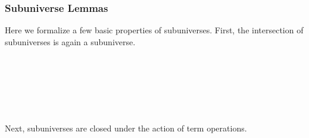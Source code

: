 \subsubsection{Subuniverse Lemmas}\label{subuniverse-lemmas}
Here we formalize a few basic properties of subuniverses. First, the intersection of subuniverses is again a subuniverse.
\ccpad
\begin{code}%
\>[0]\AgdaSpace{}%
\AgdaSymbol{:}%
\>[101I]\AgdaSymbol{\{}\AgdaSpace{}%
\AgdaSymbol{:}\AgdaSpace{}%
\AgdaSpace{}%
\AgdaSpace{}%
\AgdaSymbol{\}\{}\AgdaSpace{}%
\AgdaSymbol{:}\AgdaSpace{}%
\AgdaSpace{}%
\AgdaSymbol{\}\{}\AgdaSpace{}%
\AgdaSymbol{:}\AgdaSpace{}%
\AgdaSpace{}%
\AgdaSpace{}%
\AgdaSpace{}%
\AgdaSpace{}%
\AgdaSpace{}%
\AgdaSpace{}%
\AgdaSymbol{\}}\<%
\\
\>[1][@{}l@{\AgdaIndent{0}}]%
\>[2]%
\>[.][@{}l@{}]\<[101I]%
\>[20]\AgdaSymbol{((}\AgdaSpace{}%
\AgdaSymbol{:}\AgdaSpace{}%
\AgdaSymbol{)}\AgdaSpace{}%
\AgdaSpace{}%
\AgdaSpace{}%
\AgdaSpace{}%
\AgdaSpace{}%
\AgdaSpace{}%
\AgdaSymbol{)}\<%
\\
%
\>[20]\AgdaComment{-----------------------------------------}\<%
\\
%
\>[2]%
\>[20]\AgdaSpace{}%
\AgdaSpace{}%
\AgdaSpace{}%
\AgdaSpace{}%
\AgdaSpace{}%
\<%
\\
%
\\[\AgdaEmptyExtraSkip]%
%
\>[1]\AgdaSpace{}%
\AgdaSpace{}%
\AgdaSpace{}%
\AgdaSpace{}%
\AgdaSpace{}%
\AgdaSymbol{=}\AgdaSpace{}%
\AgdaSpace{}%
\AgdaSpace{}%
\AgdaSpace{}%
\AgdaSpace{}%
\AgdaSpace{}%
\AgdaSpace{}%
\AgdaSpace{}%
\AgdaSpace{}%
\AgdaSpace{}%
\AgdaSpace{}%
\AgdaSpace{}%
\AgdaSpace{}%
\<%
\end{code}
\ccpad
Next, subuniverses are closed under the action of term operations.
